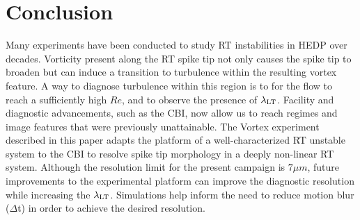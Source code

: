 \documentclass[%
 aip,
 amsmath,amssymb,
 reprint,
 floatfix
]{revtex4-1}
\begin{document}



 


\section{Conclusion}

 Many experiments have been conducted to study RT instabilities in HEDP over decades. Vorticity present along the RT spike tip not only causes the spike tip to broaden but can induce a transition to turbulence within the resulting vortex feature. A way to diagnose turbulence within this region is to for the flow to reach a sufficiently high $Re$, and to observe the presence of $\lambda_{\rm{LT}}$.  Facility and diagnostic advancements, such as the CBI, now allow us to reach regimes and image features that were previously unattainable. The Vortex experiment described in this paper adapts the platform of a well-characterized RT unstable system to the CBI to resolve spike tip morphology in a deeply non-linear RT system. Although the  resolution limit for the present campaign is $7 \mu m$, future improvements to the experimental platform can improve the diagnostic resolution while increasing the $\lambda_{\rm{LT}}$.  Simulations help inform the need to reduce motion blur ($\Delta$t) in order to achieve the desired resolution.

%
\end{document}
